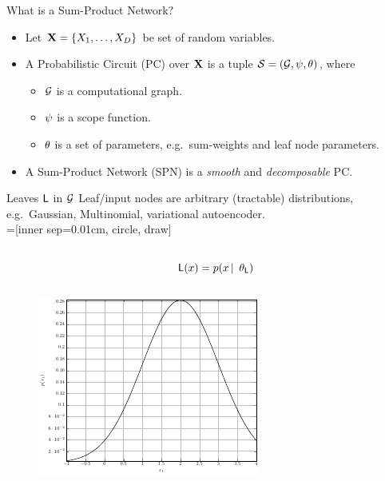 \begin{frame}{What is a Sum-Product Network?}
\begin{itemize}
    \item Let $\mathbf{X} = \{X_1, \dots, X_D\}$ be set of random variables.
  \item A Probabilistic Circuit (PC) over $\mathbf{X}$ is a tuple $\mathcal{S} = (\mathcal{G}, \psi, \mathbf{\theta})$, where
  \begin{itemize}
    \item $\mathcal{G}$ is a computational graph.
    \item $\psi$ is a scope function.
    \item $\mathbf{\theta}$ is a set of parameters, e.g.~sum-weights and leaf node parameters.
  \end{itemize}
  \item A Sum-Product Network (SPN) is a \emph{smooth} and \emph{decomposable} PC.
\end{itemize}
\end{frame}

\begin{frame}{Leaves $\mathsf{L}$ in $\mathcal{G}$}
Leaf/input nodes are arbitrary (tractable) distributions, e.g.~Gaussian, Multinomial, variational autoencoder.\\[1em]

=[inner sep=0.01cm, circle, draw]
\begin{columns}
\begin{column}{.2\linewidth}
\end{column}
\begin{column}{.2\linewidth}
\end{column}
\begin{column}{.4\linewidth}
$\Leaf(x) = p(x \cbar \tp_\Leaf)$
\end{column}
\begin{column}{.2\linewidth}
\end{column}
\end{columns}

\centering
\begin{figure}
\includegraphics{leaf_distribution}
\end{figure}
\end{frame}

